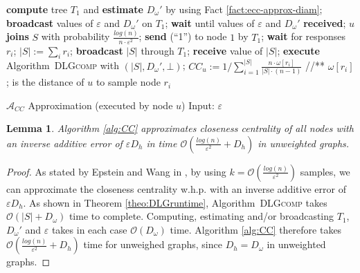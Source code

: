 \documentclass[11pt]{article}
\newcommand{\BO}{\mathcal{O}}
\newtheorem{lemma}[theorem]{Lemma}
\renewcommand{\epsilon}{\varepsilon}
\newif\iffull
\begin{document}
\begin{algorithm}[htb]
\begin{algorithmic}[1]
        \STATE \textbf{compute} tree $T_{1}$ and \textbf{estimate} $D_\omega'$ by using Fact \ref{fact:ecc-approx-diam};
        \STATE \textbf{broadcast} values of $\epsilon$ and $D_\omega'$ on $T_{1}$;
\ELSE
        \STATE \textbf{wait} until values of $\epsilon$ and $D_\omega'$ \textbf{received};
\ENDIF
\STATE $u$ \textbf{joins} $S$ with probability $\frac{log(n)}{n\cdot \epsilon^2}$;
 \label{line:CCjoinSstart}
        \STATE \textbf{send} (``1'') to node $1$ by $T_1$; \label{line:CCaccmessages}
\ENDIF
{}
        \STATE \textbf{wait} for responses $r_i$;
        \STATE $|S|:=\sum_i r_i$;
        \STATE \textbf{broadcast} $|S|$ through $T_1$;
\ELSE
        \STATE \textbf{receive} value of $|S|$;
\ENDIF \label{line:CCjoinSend}
\STATE \textbf{execute} Algorithm\iffull~\ref{alg:DLGcomp}\fi~\textsc{DLGcomp} with $(|S|,D_\omega', \bot)$; \label{line:CCexAlg}
\STATE $CC_u:=1/\sum_{i=1}^{|S|}\frac{n\cdot \omega[r_i]}{|S|\cdot (n-1)}$ //** $\omega[r_i]$; is the distance of $u$ to sample node $r_i$
\end{algorithmic}
\caption{$\mathcal{A}_{CC}$ Approximation (executed by node $u$) \newline Input: $\epsilon$ }\label{alg:CC}
\vspace*{0.5cm}
\end{algorithm}

\begin{lemma}
Algorithm \ref{alg:CC} approximates closeness centrality of all nodes with an inverse additive error of $\epsilon D_h$ in time $\BO\left(\frac{log(n)}{\epsilon^2}+D_h\right)$ in unweighted graphs.
\label{lemma:ccunweighted}
\end{lemma}

\begin{proof}
As stated by Epstein and Wang in \cite{eppstein:2001:fastCCapprox}, by using $k=\BO\left(\frac{log(n)}{\epsilon^2}\right)$ samples, we can approximate the closeness centrality w.h.p. with an inverse additive error of $\epsilon D_h$. As shown in Theorem \ref{theo:DLGruntime}, Algorithm\iffull~\ref{alg:DLGcomp}\fi~\textsc{DLGcomp} takes $\BO(|S|+D_\omega)$ time to complete. Computing, estimating and/or broadcasting $T_1$, $D_\omega'$ and $\epsilon$ takes in each case $\BO(D_\omega)$ time. Algorithm \ref{alg:CC} therefore takes $\BO\left(\frac{log(n)}{\epsilon^2}+D_h\right)$ time for unweighed graphs, since $D_h=D_\omega$ in unweighted graphs.
\end{proof} 
\end{document}
